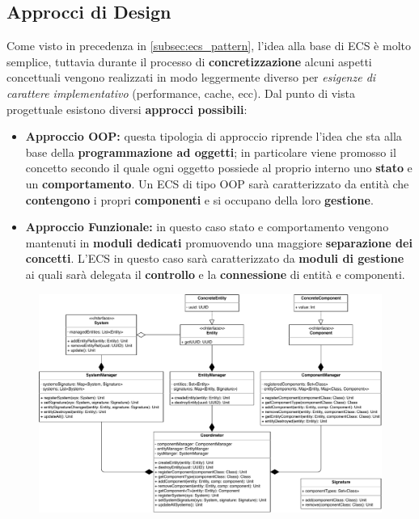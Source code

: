 \subsection{Approcci di Design}
Come visto in precedenza in \ref{subsec:ecs_pattern}, l'idea alla base di ECS è molto semplice, tuttavia durante il processo di \textbf{concretizzazione} alcuni aspetti concettuali vengono realizzati in modo leggermente diverso per \textit{esigenze di carattere implementativo} (performance, cache, ecc).  Dal punto di vista progettuale esistono diversi \textbf{approcci possibili}:
\begin{itemize}
	\item{\textbf{Approccio OOP:}} questa tipologia di approccio riprende l'idea che sta alla base della \textbf{programmazione ad oggetti}; in particolare viene promosso il concetto secondo il quale ogni oggetto possiede al proprio interno uno \textbf{stato} e un \textbf{comportamento}. Un ECS di tipo OOP sarà caratterizzato da entità che \textbf{contengono} i propri \textbf{componenti} e si occupano della loro \textbf{gestione}.
	\item{\textbf{Approccio Funzionale:}} in questo caso stato e comportamento vengono mantenuti in \textbf{moduli dedicati} promuovendo una maggiore \textbf{separazione dei concetti}. L'ECS in questo caso sarà caratterizzato da \textbf{moduli di gestione} ai quali sarà delegata il \textbf{controllo} e la \textbf{connessione} di entità e componenti.
\end{itemize}

\begin{figure}[H]
	\centering
	\includegraphics[width=0.99\columnwidth]{drawio/ECS/ECS.pdf}
	\caption{}
	\label{fig:ECS}
\end{figure}


